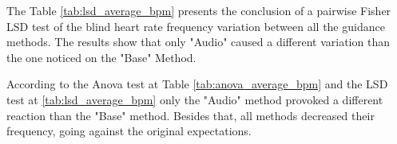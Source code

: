 

The Table \ref{tab:lsd_average_bpm} presents the conclusion of a pairwise Fisher LSD test of the blind heart rate frequency variation between all the guidance methods. The results show that only "Audio" caused a different variation than the one noticed on the "Base" Method.



%
%
%
%
%
%
%
%
%
%
%    
%
%

According to the Anova test at Table \ref{tab:anova_average_bpm} and the LSD test at \ref{tab:lsd_average_bpm} only the "Audio" method provoked a different reaction than the "Base" method. Besides that, all methods decreased their frequency, going against the original expectations.

\FloatBarrier